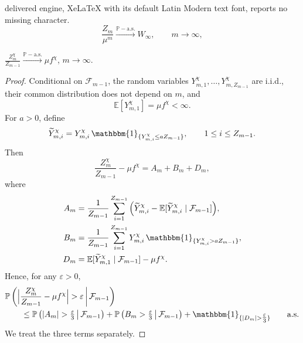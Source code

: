 \documentclass[10pt,a4paper]{amsart}
\newcommand{\EE}{\mathbb E}
\newcommand{\PP}{\mathbb{P}}
\begin{document}
delivered engine, XeLaTeX with its default Latin Modern text font, reports no missing character.
\begin{equation}
\label{eq:KSthm*}
\frac{Z_m}{\mu^m} \stackrel{\PP-\mathrm{a.s.}}{\longrightarrow} W_\infty, \qquad m\to\infty,
\end{equation}

\begin{lemma}
\label{lem:randomindexSLLN}
$\frac{Z_m^\chi}{Z_{m-1}} \stackrel{\PP-\mathrm{a.s.}}{\longrightarrow} \mu f^\chi$, $m\to \infty$.
\end{lemma}

\begin{proof}
Conditional on $\mathcal{F}_{m-1}$, the random variables $Y_{m,1}^{\chi},\ldots,Y_{m,Z_{m-1}}^{\chi}$ are i.i.d., their common distribution does not depend on $m$, and 
\[
\EE[Y_{m,1}^{\chi}]=\mu f^{\chi} < \infty .
\]
For $a>0$, define
\[
\widetilde{Y}_{m,i}^{\chi} = Y_{m,i}^{\chi}\, \mathbbm{1}_{\{Y_{m,i}^{\chi}\leq a Z_{m-1}\}}, \qquad 1\leq i\leq Z_{m-1}.
\]
Then
\[
\frac{Z_m^{\chi}}{Z_{m-1}}-\mu f^{\chi} = A_m + B_m + D_m,
\]
where
\[
\begin{aligned}
A_m &= \frac1{Z_{m-1}} \sum_{i=1}^{Z_{m-1}} \Big( \widetilde{Y}_{m,i}^{\chi} - \EE[\widetilde{Y}_{m,i}^{\chi}\mid\mathcal{F}_{m-1}] \Big),\\
B_m &= \frac{1}{Z_{m-1}} \sum_{i=1}^{Z_{m-1}} Y_{m,i}^{\chi}\, \mathbbm{1}_{\{Y_{m,i}^{\chi}>aZ_{m-1}\}},\\
D_m &= \EE[\widetilde{Y}_{m,1}^{\chi}\mid\mathcal{F}_{m-1}] -\mu f^{\chi}.
\end{aligned}
\]
Hence, for any $\varepsilon > 0$,
\[
\begin{aligned}
&\PP\left( \Big| \frac{Z_m^\chi}{Z_{m-1}}-\mu f^\chi \Big| >\varepsilon \,\middle|\, \mathcal{F}_{m-1} \right)\\
&\qquad \leq \PP\left( |A_m|>\tfrac{\varepsilon}{3} \,\middle|\, \mathcal{F}_{m-1} \right) 
+ \PP\left( B_m >\tfrac{\varepsilon}{3} \,\middle|\, \mathcal{F}_{m-1} \right) 
+ \mathbbm{1}_{\{|D_m|>\tfrac{\varepsilon}{3}\}} \qquad \mathrm{a.s.}
\end{aligned}
\]
We treat the three terms separately.


\end{proof}
\end{document}
